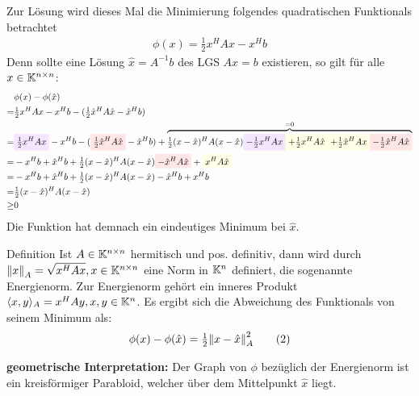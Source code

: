 Zur Lösung wird dieses Mal die Minimierung folgendes quadratischen Funktionals betrachtet
%
\begin{align*}
  \phi(x)
  = \tfrac{1}{2}x^H A x - x^H b
  \tag{1}\label{eq:CGVeq1}
\end{align*}
%
Denn sollte eine Lösung $\hat{x}=A^{-1}b$ des LGS $Ax=b$ existieren, so gilt für alle $x\in\mathbb K^{n\times n}$:
%
\begin{align*}
  &\phi(x)-\phi(\hat{x}) \\
  =& \tfrac{1}{2}x^H A x - x^H b - (\tfrac{1}{2}\hat{x}^H A \hat{x} - \hat{x}^H b) \\
  =&  \highlight{mypurple}{\tfrac{1}{2}x^H A x} 
      - x^H b 
      - (\highlight{myred}{\tfrac{1}{2}\hat{x}^H A \hat{x}} 
      - \hat{x}^H b) 
      + \overbrace{
        \tfrac{1}{2}(x-\hat{x})^H A (x-\hat{x}) 
        \highlight{mypurple}{- \tfrac{1}{2} x^H A x}
        \highlight{myyellow}{+ \tfrac{1}{2}x^H A \hat{x}}
        \highlight{myyellow}{+ \tfrac{1}{2} \hat{x}^H A x}
        \highlight{myred}{- \tfrac{1}{2}\hat{x}^H A \hat{x}}
  }^{=0} \\
  =& -x^H b + \hat{x}^H b + \tfrac{1}{2}(x-\hat{x})^H A (x-\hat{x}) 
  \highlight{myred}{- \hat{x}^H A \hat{x}} + \highlight{myyellow}{x^H A \hat{x}} \\
  =& -x^H b + \hat{x}^H b + \tfrac{1}{2}(x-\hat{x})^H A (x-\hat{x})  - \hat{x}^H b + x^H b \\
  =& \tfrac{1}{2} (x-\hat{x})^H A(x-\hat{x}) \\
  \geq& 0
\end{align*}
%
Die Funktion hat demnach ein eindeutiges Minimum bei $\hat{x}$.

\begin{colbox}{Definition}
  Ist $A\in\mathbb K^{n\times n}$ hermitisch und pos. definitiv, dann wird durch $\vertn{2}{x}_A=\sqrt{x^HAx}, 
  x\in\K^{n\times n}$ eine Norm in $\mathbb K^n$ definiert, die sogenannte Energienorm. 
  Zur Energienorm gehört ein inneres Produkt $\langle x,y\rangle_A=x^HAy, x,y\in\mathbb K^n$.
  Es ergibt sich die Abweichung des Funktionals von seinem Minimum als:
  \begin{align*}
    \phi(x)-\phi(\hat{x}) 
    = \tfrac{1}{2}\vertn{2}{x-\hat{x}}^2_A
    \tag{2}\label{eq:CGVeq2}
  \end{align*}
\end{colbox}

\textbf{geometrische Interpretation:} Der Graph von $\phi$ bezüglich der Energienorm ist ein kreisförmiger Parabloid, 
welcher über dem Mittelpunkt $\hat{x}$ liegt. 

